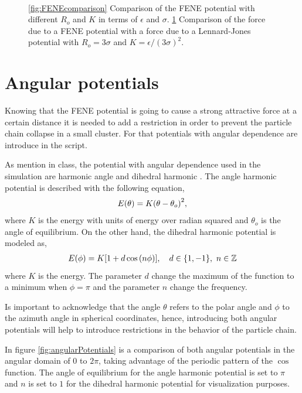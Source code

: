 \documentclass[main.tex]{subfiles}
\begin{document}
\begin{figure}[ht!]
\begin{subfigure}[c]{0.48\textwidth}
        \caption{~}\label{fig:Forcecomparison}
    \end{subfigure}
    \caption{
        \ref{fig:FENEcomparison} Comparison of the FENE potential with different $R_{o}$ and $K$ in terms of $\epsilon$ and $\sigma$.
        \ref{fig:Forcecomparison} Comparison of the force due to a FENE potential with a force due to a Lennard-Jones potential with $R_{o} = 3\sigma$ and $K = \epsilon/(3\sigma)^2$.
    }
    \label{fig:ComparisonFENNE-LJ}
\end{figure}

\section{Angular potentials}

Knowing that the FENE potential is going to cause a strong attractive force at a certain distance it is needed to add a restriction in order to prevent the particle chain collapse in a small cluster.
For that potentials with angular dependence are introduce in the script.

As mention in class, the potential with angular dependence used in the simulation are harmonic angle \cite{angle_style_Harmonic_LAMMPSdoc} and dihedral harmonic \cite{dihedral_style_Harmonic_LAMMPSdoc}.
The angle harmonic potential is described with the following equation,
\begin{gather}
    E\qty(\theta) = K\qty(\theta-\theta_{o})^{2}\label{eqn4:anglePotential},
\end{gather}
where $K$ is the energy with units of energy over radian squared and $\theta_{o}$ is the angle of equilibrium.
On the other hand, the dihedral harmonic potential is modeled as,
\begin{gather}
    E\qty(\phi) = K\qty[1+d\cos\qty(n\phi)]\label{eqn4:dihedralPotential},\quad d\in\{1,-1\},~n\in\mathbb{Z}
\end{gather}
where $K$ is the energy. 
The parameter $d$ change the maximum of the function to a minimum when $\phi = \pi$ and the parameter $n$ change the frequency.

Is important to acknowledge that the angle $\theta$ refers to the polar angle and $\phi$ to the azimuth angle in spherical coordinates, hence, introducing both angular potentials will help to introduce restrictions in the behavior of the particle chain.

In figure \ref{fig:angularPotentials} is a comparison of both angular potentials in the angular domain of $0$ to $2\pi$, taking advantage of the periodic pattern of the $\cos$ function.
The angle of equilibrium for the angle harmonic potential is set to $\pi$ and $n$ is set to $1$ for the dihedral harmonic potential for visualization purposes.
\end{document}
